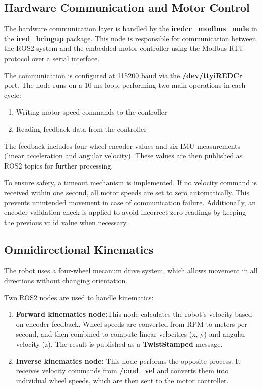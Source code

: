 \subsection{Hardware Communication and Motor Control}
The hardware communication layer is handled by the \textbf{iredcr\_modbus\_node} in the \textbf{ired\_bringup} package. This node is responsible for communication between the ROS2 system and the embedded motor controller using the Modbus RTU protocol over a serial interface.

The communication is configured at 115200 baud via the \textbf{/dev/ttyiREDCr} port. The node runs on a 10 ms loop, performing two main operations in each cycle:
\begin{enumerate}
    \item Writing motor speed commands to the controller
    \item Reading feedback data from the controller
\end{enumerate}

The feedback includes four wheel encoder values and six IMU measurements (linear acceleration and angular velocity). These values are then published as ROS2 topics for further processing.

To ensure safety, a timeout mechanism is implemented. If no velocity command is received within one second, all motor speeds are set to zero automatically. This prevents unintended movement in case of communication failure. Additionally, an encoder validation check is applied to avoid incorrect zero readings by keeping the previous valid value when necessary.

\subsection{Omnidirectional Kinematics}
The robot uses a four-wheel mecanum drive system, which allows movement in all directions without changing orientation.

Two ROS2 nodes are used to handle kinematics:
\begin{enumerate}
    \item \textbf{Forward kinematics node:}This node calculates the robot’s velocity based on encoder feedback. Wheel speeds are converted from RPM to meters per second, and then combined to compute linear velocities (x, y) and angular velocity (z). The result is published as a \textbf{TwistStamped} message.
    \item \textbf{Inverse kinematics node:} This node performs the opposite process. It receives velocity commands from \textbf{/cmd\_vel} and converts them into individual wheel speeds, which are then sent to the motor controller.

\end{enumerate}
